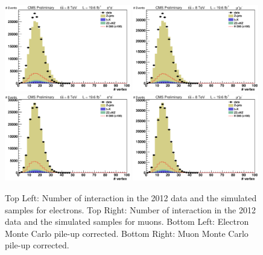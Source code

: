 \begin{figure}[htb]
\centering
\includegraphics[width=0.49\textwidth]{Selection/before_el_nvtx.eps}
\includegraphics[width=0.49\textwidth]{Selection/before_mu_nvtx.eps}\\
\includegraphics[width=0.49\textwidth]{Selection/after_el_nvtx.eps}
\includegraphics[width=0.49\textwidth]{Selection/after_mu_nvtx.eps}\\
\caption{Top Left: Number of interaction in the 2012 data and the simulated samples for electrons.  Top Right:  Number of interaction in the 2012 data and the simulated samples for muons. Bottom Left: Electron Monte Carlo pile-up corrected. Bottom Right: Muon Monte Carlo pile-up corrected.}
\label{fig:PileUp}
\end{figure}


